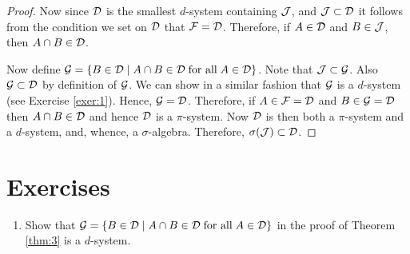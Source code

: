\begin{proof}
Now since $\mathcal D$ is the smallest $d$-system containing $\mathcal J$, and $\mathcal J\subset\mathcal D$ it follows from the condition we set on $\mathcal D$ that $\mathcal F=\mathcal D$. Therefore, if $A\in\mathcal D$ and $B\in\mathcal J$, then $A\cap B\in\mathcal D$.

Now define $\mathcal G=\{B\in\mathcal D\mid A\cap B\in\mathcal D\; \text{for all}\; A\in\mathcal D  \}$. Note that $\mathcal J\subset\mathcal G$. Also $\mathcal G\subset\mathcal D$ by definition of $\mathcal G$. We can show in a similar fashion that $\mathcal G$ is a $d$-system (see Exercise \ref{exer:1}). Hence, $\mathcal G=\mathcal D$. Therefore, if $A\in\mathcal F=\mathcal D$ and $B\in\mathcal G=\mathcal D$ then $A\cap B\in\mathcal D$ and hence $\mathcal D$ is a $\pi$-system. Now $\mathcal D$ is then both a $\pi$-system and a $d$-system, and, whence, a $\sigma$-algebra. Therefore, $\sigma(\mathcal J)\subset\mathcal D$.
\end{proof}

\section*{Exercises}

\begin{enumerate}
\item\label{exer:1} Show that $\mathcal G=\{B\in\mathcal D\mid A\cap B\in\mathcal D\; \text{for all}\; A\in\mathcal D  \}$ in the proof of Theorem \eqref{thm:3} is a $d$-system.
\end{enumerate}